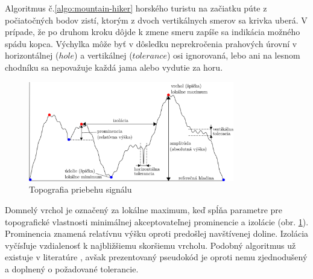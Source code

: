 Algoritmus č.\ref{algo:mountain-hiker} horského turistu na začiatku púte z počiatočných bodov zistí, ktorým z dvoch vertikálnych
smerov sa krivka uberá. V prípade, že po druhom kroku dôjde k zmene smeru zapíše sa indikácia možného spádu kopca.
Výchylka môže byť v dôsledku neprekročenia prahových úrovní v horizontálnej ($hole$) a vertikálnej ($tolerance$) osi
ignorovaná, lebo ani na lesnom chodníku sa nepovažuje každá jama alebo vydutie za horu.
\begin{figure}[h]
    \centering
    \includegraphics[width=0.8\textwidth]{figures/analysis/topography.png}
    \caption{Topografia priebehu signálu}
    \label{fig:topography}
\end{figure}

Domnelý vrchol je označený za lokálne maximum, keď spĺňa parametre pre topografické vlastnosti minimálnej akceptovateľnej
prominencie a izolácie (obr. \ref{fig:topography}). Prominencia znamená relatívnu výšku oproti predošlej navštívenej doline. Izolácia vyčísľuje vzdialenosť k najbližšiemu skoršiemu vrcholu. Podobný algoritmus už existuje v literatúre \cite{peek-mountaineer-method}, avšak prezentovaný pseudokód je oproti nemu zjednodušený a doplnený o požadované tolerancie.

